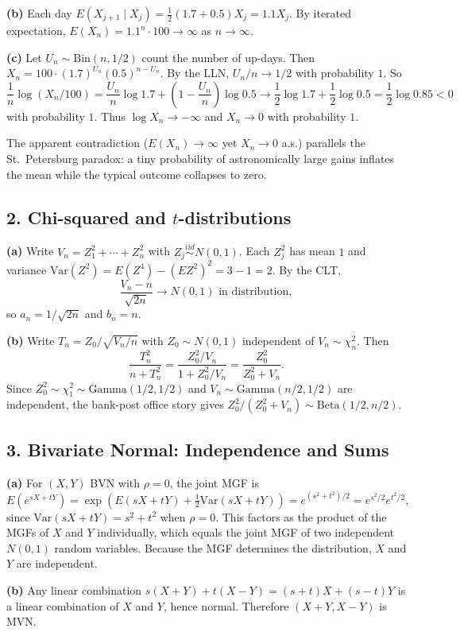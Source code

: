 \documentclass{article}
\begin{document}
\textbf{(b)} Each day $E(X_{j+1}\mid X_j)=\frac{1}{2}(1.7+0.5)X_j=1.1X_j$. By iterated expectation, $E(X_n)=1.1^n\cdot100\to\infty$ as $n\to\infty$.

\textbf{(c)} Let $U_n\sim\text{Bin}(n,1/2)$ count the number of up-days. Then $X_n=100\cdot(1.7)^{U_n}(0.5)^{n-U_n}$. By the LLN, $U_n/n\to1/2$ with probability $1$. So
$$
\frac{1}{n}\log(X_n/100)=\frac{U_n}{n}\log1.7+\left(1-\frac{U_n}{n}\right)\log0.5\to\frac{1}{2}\log1.7+\frac{1}{2}\log0.5=\frac{1}{2}\log0.85<0
$$
with probability $1$. Thus $\log X_n\to-\infty$ and $X_n\to0$ with probability $1$.

The apparent contradiction ($E(X_n)\to\infty$ yet $X_n\to0$ a.s.) parallels the St.\ Petersburg paradox: a tiny probability of astronomically large gains inflates the mean while the typical outcome collapses to zero.

\subsection*{2. Chi-squared and $t$-distributions}

\textbf{(a)} Write $V_n=Z_1^2+\cdots+Z_n^2$ with $Z_j\overset{iid}{\sim}N(0,1)$. Each $Z_j^2$ has mean $1$ and variance $\text{Var}(Z^2)=E(Z^4)-(EZ^2)^2=3-1=2$. By the CLT,
$$
\frac{V_n-n}{\sqrt{2n}}\to N(0,1)\text{ in distribution},
$$
so $a_n=1/\sqrt{2n}$ and $b_n=n$.

\textbf{(b)} Write $T_n=Z_0/\sqrt{V_n/n}$ with $Z_0\sim N(0,1)$ independent of $V_n\sim\chi^2_n$. Then
$$
\frac{T_n^2}{n+T_n^2}=\frac{Z_0^2/V_n}{1+Z_0^2/V_n}=\frac{Z_0^2}{Z_0^2+V_n}.
$$
Since $Z_0^2\sim\chi^2_1\sim\text{Gamma}(1/2,1/2)$ and $V_n\sim\text{Gamma}(n/2,1/2)$ are independent, the bank-post office story gives $Z_0^2/(Z_0^2+V_n)\sim\text{Beta}(1/2,n/2)$.

\subsection*{3. Bivariate Normal: Independence and Sums}

\textbf{(a)} For $(X,Y)$ BVN with $\rho=0$, the joint MGF is
$$
E(e^{sX+tY})=\exp\!\left(E(sX+tY)+\tfrac12\text{Var}(sX+tY)\right)=e^{(s^2+t^2)/2}=e^{s^2/2}e^{t^2/2},
$$
since $\text{Var}(sX+tY)=s^2+t^2$ when $\rho=0$. This factors as the product of the MGFs of $X$ and $Y$ individually, which equals the joint MGF of two independent $N(0,1)$ random variables. Because the MGF determines the distribution, $X$ and $Y$ are independent.

\textbf{(b)} Any linear combination $s(X+Y)+t(X-Y)=(s+t)X+(s-t)Y$ is a linear combination of $X$ and $Y$, hence normal. Therefore $(X+Y,X-Y)$ is MVN.
\end{document}
